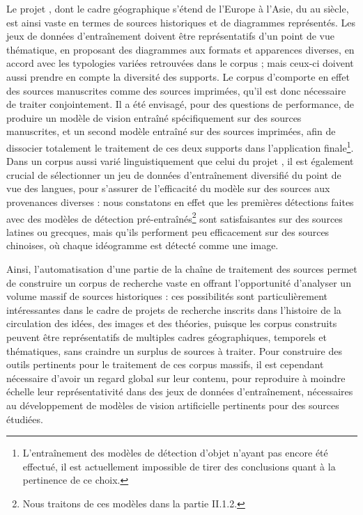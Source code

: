 	Le projet \eida, dont le cadre géographique s'étend de l'Europe à l'Asie, du \viii au \xviii siècle, est ainsi vaste en termes de sources historiques et de diagrammes représentés. Les jeux de données d'entraînement doivent être représentatifs d'un point de vue thématique, en proposant des diagrammes aux formats et apparences diverses, en accord avec les typologies variées retrouvées dans le corpus ; mais ceux-ci doivent aussi prendre en compte la diversité des supports. Le corpus d'\eida comporte en effet des sources manuscrites comme des sources imprimées, qu'il est donc nécessaire de traiter conjointement. Il a été envisagé, pour des questions de performance, de produire un modèle de vision entraîné spécifiquement sur des sources manuscrites, et un second modèle entraîné sur des sources imprimées, afin de dissocier totalement le traitement de ces deux supports dans l'application finale\footnote{L'entraînement des modèles de détection d'objet n'ayant pas encore été effectué, il est actuellement impossible de tirer des conclusions quant à la pertinence de ce choix.}. Dans un corpus aussi varié linguistiquement que celui du projet \eida, il est également crucial de sélectionner un jeu de données d'entraînement diversifié du point de vue des langues, pour s'assurer de l'efficacité du modèle sur des sources aux provenances diverses : nous constatons en effet que les premières détections faites avec des modèles de détection pré-entraînés\footnote{Nous traitons de ces modèles dans la partie II.1.2.} sont satisfaisantes sur des sources latines ou grecques, mais qu'ils performent peu efficacement sur des sources chinoises, où chaque idéogramme est détecté comme une image.
	
	Ainsi, l'automatisation d'une partie de la chaîne de traitement des sources permet de construire un corpus de recherche vaste en offrant l'opportunité d'analyser un volume massif de sources historiques : ces possibilités sont particulièrement intéressantes dans le cadre de projets de recherche inscrits dans l'histoire de la circulation des idées, des images et des théories, puisque les corpus construits peuvent être représentatifs de multiples cadres géographiques, temporels et thématiques, sans craindre un surplus de sources à traiter. Pour construire des outils pertinents pour le traitement de ces corpus massifs, il est cependant nécessaire d'avoir un regard global sur leur contenu, pour reproduire à moindre échelle leur représentativité dans des jeux de données d'entraînement, nécessaires au développement de modèles de vision artificielle pertinents pour des sources étudiées.
    

